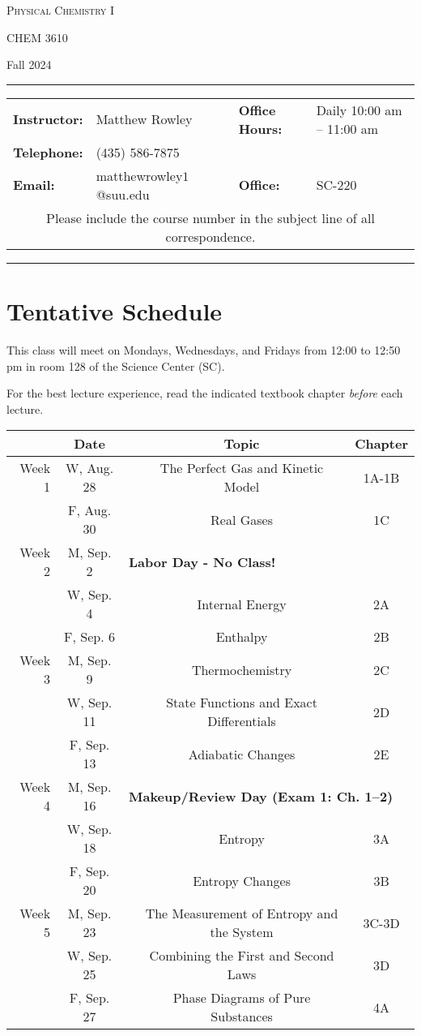 \documentclass[12pt, letterpaper]{article}
\begin{document}
\begin{center}
{\Large \textsc{Physical Chemistry I}}

CHEM 3610
\end{center}
\begin{center}
	{\large Fall 2024}
\end{center}
\begin{center}
	\rule{0.99\textwidth}{0.4pt}
	\begin{tabular}{llcll}
		\textbf{Instructor:} & Matthew Rowley           &  & \textbf{Office Hours:} & Daily 10:00 am -- 11:00 am \\
		\textbf{Telephone:}  & (435) 586-7875           &  &                        &  \\
		\textbf{Email:}      & matthewrowley$1$@suu.edu &  & \textbf{Office:}       & SC-220                   \\
		\multicolumn{5}{c}{Please include the course number in the subject line of all correspondence.}
	\end{tabular}
	\rule{0.99\textwidth}{0.4pt}
\end{center}

\section*{Tentative Schedule}
This class will meet on Mondays, Wednesdays, and Fridays from 12:00 to 12:50 pm in room 128 of the Science Center (SC).

\noindent For the best lecture experience, read the indicated textbook chapter \emph{before} each lecture.

\begin{tabular}{rcccc}
& Date && Topic & Chapter\\
\midrule
Week 1 & W, Aug. 28&& The Perfect Gas and Kinetic Model & 1A-1B\\
& F, Aug. 30&& Real Gases & 1C\\
\midrule
Week 2 & M, Sep. 2& \multicolumn{3}{l}{\textbf{Labor Day - No Class!}}\\
& W, Sep. 4&& Internal Energy & 2A\\
& F, Sep. 6&& Enthalpy & 2B\\
\midrule
Week 3 & M, Sep. 9&& Thermochemistry & 2C\\
& W, Sep. 11&& State Functions and Exact Differentials & 2D\\
& F, Sep. 13&& Adiabatic Changes & 2E\\
\midrule
Week 4 & M, Sep. 16& \multicolumn{3}{l}{\textbf{Makeup/Review Day (Exam 1: Ch. 1--2)}}\\
& W, Sep. 18&& Entropy & 3A\\
& F, Sep. 20&& Entropy Changes & 3B\\
\midrule
Week 5 & M, Sep. 23&& The Measurement of Entropy and the System & 3C-3D\\
& W, Sep. 25&& Combining the First and Second Laws & 3D\\
& F, Sep. 27&& Phase Diagrams of Pure Substances & 4A\\
\end{tabular}
\end{document}
